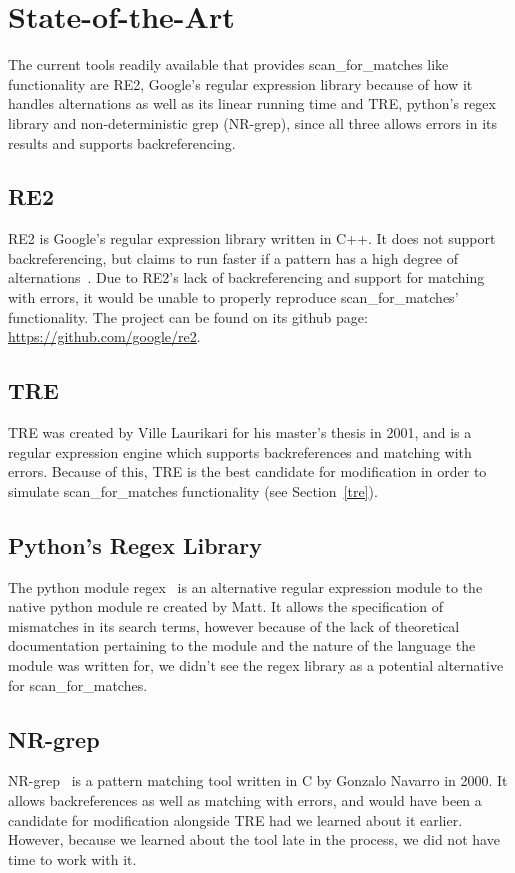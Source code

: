 \section{State-of-the-Art}
The current tools readily available that provides scan\_for\_matches like 
functionality are RE2, Google's regular expression library because of 
how it handles alternations as well as its linear running time and TRE, 
python's regex library and non-deterministic grep (NR-grep), since all three 
allows errors in its results and supports backreferencing. %
 \subsection{RE2} %
 RE2 is Google's regular expression library written in C++. It does not 
 support backreferencing, but claims to run faster if a pattern has a high degree 
 of alternations~\cite{re2java}. Due to RE2's lack of backreferencing and support for 
 matching with errors, it would be unable to properly reproduce 
 scan\_for\_matches' functionality. The project can be found on its github 
 page: \url{https://github.com/google/re2}.
 \subsection{TRE} %
 TRE was created by Ville Laurikari for his master's thesis in 
 2001\cite{LaurikariComplex}, and is a regular expression engine which supports 
 backreferences and matching with errors. Because of this, TRE is the best 
 candidate for modification in order to simulate scan\_for\_matches 
 functionality (see Section~\ref{tre}).
 \subsection{Python's Regex Library} %
 The python module regex~\cite{pythonregex} is an alternative regular expression 
 module to the native python module re created by Matt. It allows the 
 specification of mismatches in its search terms, however because of the lack 
 of theoretical documentation pertaining to the module and the nature of 
 the language the module was written for, we didn't see the regex library as 
 a potential alternative for scan\_for\_matches. 
 \subsection{NR-grep}
 NR-grep~\cite{Navarro00nr-grep:a} is a pattern matching tool written 
 in C by Gonzalo Navarro in 2000. It allows backreferences as well as matching 
 with errors, and would have been a candidate for modification alongside TRE had 
 we learned about it earlier. However, because we learned about the tool 
 late in the process, we did not have time to work with it.
